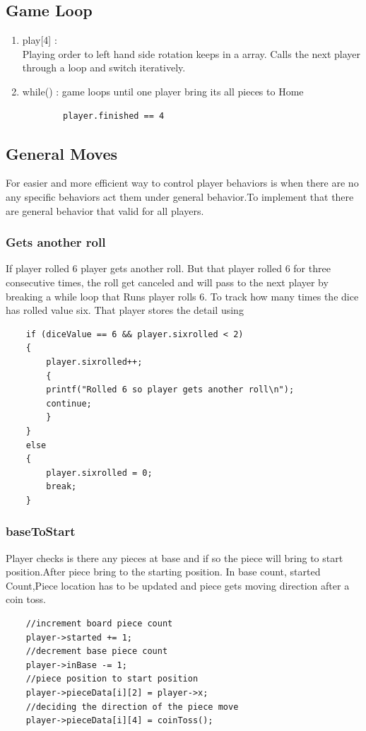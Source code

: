 \documentclass{article}
\begin{document}
\subsection{Game Loop}
\begin{enumerate}
    \item {play[4]} :\\
    \justify
    Playing order to left hand side rotation keeps in a array. Calls the next player through a loop and switch iteratively.
    \item {while()} : game loops until one player bring its all pieces to Home
    \begin{verbatim}
        player.finished == 4
\end{verbatim}
    
\end{enumerate}
\newpage

\subsection{General Moves}

For easier and more efficient way to control player behaviors is when there are no any specific behaviors act them under general behavior.To implement that there are general behavior that valid for all players.

\subsubsection{Gets another roll}

    If player rolled 6 player gets another roll. But that player rolled 6 for three consecutive times, the roll get canceled and will pass to the next player by breaking a while loop that Runs player rolls 6. To track how many times the dice has rolled value six. That player stores the detail using
\begin{verbatim}
    if (diceValue == 6 && player.sixrolled < 2)
    {
        player.sixrolled++;
        {
        printf("Rolled 6 so player gets another roll\n");
        continue;
        }
    }
    else
    {
        player.sixrolled = 0;
        break;
    }
\end{verbatim}

\subsubsection{baseToStart}
Player checks is there any pieces at base and if so the piece will bring to start position.After piece bring to the starting position. In base count, started Count,Piece location has to be updated and piece gets moving direction after a coin toss.
\begin{verbatim}
    //increment board piece count
    player->started += 1;
    //decrement base piece count
    player->inBase -= 1; 
    //piece position to start position
    player->pieceData[i][2] = player->x; 
    //deciding the direction of the piece move
    player->pieceData[i][4] = coinToss();
\end{verbatim}
\end{document}
